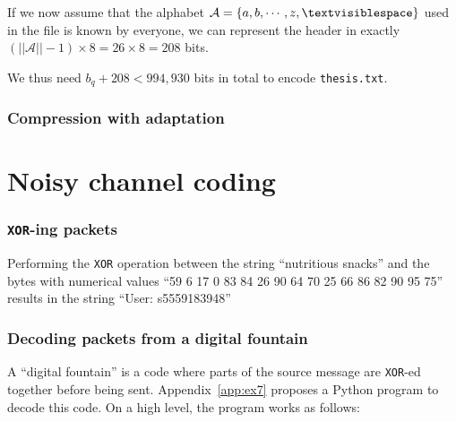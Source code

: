 \documentclass[10pt,a4paper,oneside,onecolumn]{article}
\newcommand*{\thesisTXT}{{\tt thesis.txt}\xspace}
\newcommand*{\XOR}{{\tt XOR}\xspace}
\newcommand*{\norm}[1]{\ensuremath{\left|\left|#1\right|\right|}}
\newcommand*{\lbr}{\ensuremath{\left\{}}
\newcommand*{\rbr}{\ensuremath{\right\}}}
\begin{document}
If we now assume that the alphabet $\mathcal{A} = \lbr a, b, \cdots, z,
\textvisiblespace \rbr$ used in the file is known by everyone\footnotemark, we
can represent the header in exactly $(\norm{\mathcal{A}} - 1) \times 8 = 26
\times 8 = 208$ bits.\footnotemark
{}

We thus need $b_q + 208 < 994,930$ bits in total to encode \thesisTXT.


\section{Compression with adaptation}\label{sec:ex5}


\part{Noisy channel coding}

\section{\XOR-ing packets}\label{sec:ex6}

Performing the \XOR operation between the string ``nutritious snacks'' and the
bytes with numerical values ``59 6 17 0 83 84 26 90 64 70 25 66 86 82 90 95 75''
results in the string ``User: s5559183948''

\section{Decoding packets from a digital fountain}\label{sec:ex7}

A ``digital fountain'' is a code where parts of the source message are \XOR-ed
together before being sent. Appendix~\ref{app:ex7} proposes a Python program to
decode this code. On a high level, the program works as follows:
\end{document}
